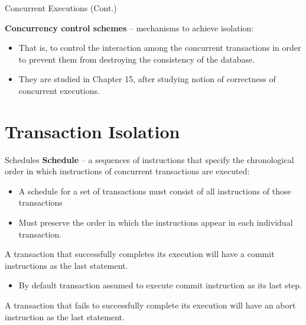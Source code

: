 \documentclass{beamer}
\begin{document}
\begin{frame}{Concurrent Executions (Cont.)}

    \textbf{Concurrency control schemes} – mechanisms to achieve isolation:
        \begin{itemize}
            \item That is, to control the interaction among the concurrent transactions in order to prevent them from destroying the consistency of the database.
            \item They are studied in Chapter 15, after studying notion of correctness of concurrent executions.
        \end{itemize}

\end{frame}

\section{Transaction Isolation}

\begin{frame}{Schedules}
    \textbf{Schedule} – a sequences of instructions that specify the chronological order in which instructions of concurrent transactions are executed:
        \begin{itemize}
            \item A schedule for a set of transactions must consist of all instructions of those transactions
            \item Must preserve the order in which the instructions appear in each individual transaction.
        \end{itemize}

    A transaction that successfully completes its execution will have a commit instructions as the last statement.
        \begin{itemize}
            \item By default transaction assumed to execute commit instruction as its last step.
        \end{itemize}

    A transaction that fails to successfully complete its execution will have an abort instruction as the last statement.
\end{frame}
\end{document}
